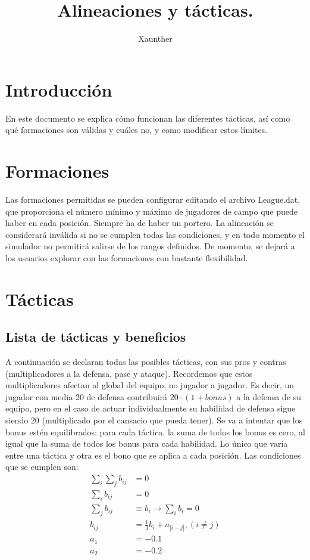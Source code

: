 \documentclass[a4paper,9pt]{article}
\title{Alineaciones y tácticas.}
\author{Xaunther}
\begin{document}
\maketitle

\section{Introducci\'on}
En este documento se explica cómo funcionan las diferentes tácticas, así como qué formaciones son válidas y cuáles no, y como modificar estos límites.

\section{Formaciones}\label{sec:Formaciones}
Las formaciones permitidas se pueden configurar editando el archivo League.dat, que proporciona el número mínimo y máximo de jugadores de campo que puede haber en cada posición. Siempre ha de haber un portero. La alineación se considerará inválida si no se cumplen todas las condiciones, y en todo momento el simulador no permitirá salirse de los rangos definidos. De momento, se dejará a los usuarios explorar con las formaciones con bastante flexibilidad.

\section{Tácticas}\label{sec:Tacticas}
\subsection{Lista de tácticas y beneficios}\label{sec:ListaTacticas}
A continuación se declaran todas las posibles tácticas, con sus pros y contras (multiplicadores a la defensa, pase y ataque). Recordemos que estos multiplicadores afectan al global del equipo, no jugador a jugador. Es decir, un jugador con media 20 de defensa contribuirá $20\cdot (1+bonus)$ a la defensa de su equipo, pero en el caso de actuar individualmente su habilidad de defensa sigue siendo 20 (multiplicado por el cansacio que pueda tener). Se va a intentar que los bonus estén equilibrados: para cada táctica, la suma de todos los bonus es cero, al igual que la suma de todos los bonus para cada habilidad. Lo único que varía entre una táctica y otra es el bono que se aplica a cada posición. Las condiciones que se cumplen son:
\begin{align}
	\sum_i\sum_j b_{ij}&=0\\
	\sum_i b_{ij}&=0\\
	\sum_j b_{ij}&\equiv b_i\rightarrow \sum_i b_i = 0\\
	b_{ij}&=\frac{1}{3}b_i+a_{|i-j|},(i\neq j)\\
	a_1 &= -0.1\\
	a_2 &= -0.2
\end{align}
\end{document}
